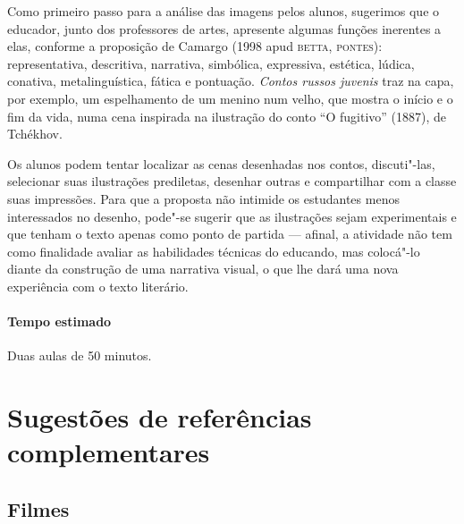\documentclass[11pt]{extarticle}
\begin{document}

Como primeiro passo para a análise das imagens pelos alunos, sugerimos
que o educador, junto dos professores de artes, apresente algumas funções inerentes a elas, conforme a
proposição de Camargo (1998 apud \textsc{betta}, \textsc{pontes}): representativa,
descritiva, narrativa, simbólica, expressiva, estética, lúdica,
conativa, metalinguística, fática e pontuação. \emph{Contos russos
juvenis} traz na capa, por exemplo, um espelhamento de um menino num
velho, que mostra o início e o fim da vida, numa cena inspirada na
ilustração do conto ``O fugitivo'' (1887), de Tchékhov.
	
Os alunos podem tentar localizar as cenas desenhadas nos contos,
discuti"-las, selecionar suas ilustrações prediletas, desenhar outras e
compartilhar com a classe suas impressões. Para que a proposta não
intimide os estudantes menos interessados no desenho, pode"-se sugerir
que as ilustrações sejam experimentais e que tenham o texto apenas como
ponto de partida --- afinal, a atividade não tem como finalidade avaliar
as habilidades técnicas do educando, mas colocá"-lo diante da construção
de uma narrativa visual, o que lhe dará uma nova experiência com o texto
literário.

\paragraph{Tempo estimado} Duas aulas de 50 minutos.


\section{Sugestões de referências complementares}

\subsection{Filmes}
\end{document}
